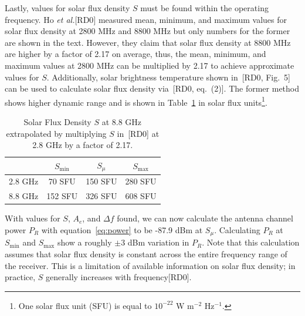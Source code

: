 \documentclass[titlepage]{article}
\newcommand{\nraocite}[1]{[RD0\cite{#1}]}
\newcommand{\nraoprecite}[2][]{[RD0\cite{#2}{, #1}]}
\begin{document}
Lastly, values for solar flux density $S$ must be found within the operating frequency. Ho \textit{et al.}\nraocite{solartemp} measured mean, minimum, and maximum values for solar flux density at 2800 MHz and 8800 MHz but only numbers for the former are shown in the text. However, they claim that solar flux density at 8800 MHz are higher by a factor of 2.17 on average, thus, the mean, minimum, and maximum values at 2800 MHz can be multiplied by 2.17 to achieve approximate values for $S$. Additionally, solar brightness temperature shown in~\nraoprecite[Fig.~5]{solartemp} can be used to calculate solar flux density via~\nraoprecite[eq.~(2)]{solartemp}. The former method shows higher dynamic range and is shown in Table~\ref{tab:sfd} in solar flux units\footnote{One solar flux unit (SFU) is equal to $10^{-22}$ W m$^{-2}$ Hz$^{-1}$.}.
\begin{table}[!ht]
\centering
\begin{tabular}{c|c|c|c}
    & $S_{\min}$ & $S_{\mu}$ & $S_{\max}$ \\ \hline
    2.8 GHz & 70 SFU & 150 SFU & 280 SFU \\
    8.8 GHz & 152 SFU & 326 SFU & 608 SFU
\end{tabular}
\label{tab:sfd}
\caption{Solar Flux Density $S$ at 8.8 GHz extrapolated by multiplying $S$ in~\nraocite{solartemp} at 2.8 GHz by a factor of 2.17.}
\end{table}

With values for $S$, $A_e$, and $\Delta f$ found, we can now calculate the antenna channel power $P_R$ with equation~\ref{eq:power} to be -87.9 dBm at $S_{\mu}$. Calculating $P_R$ at $S_{\min}$ and $S_{\max}$ show a roughly $\pm$3 dBm variation in $P_R$. Note that this calculation assumes that solar flux density is constant across the entire frequency range of the receiver. This is a limitation of available information on solar flux density; in practice, $S$ generally increases with frequency\nraocite{sfd1986}.
\end{document}
